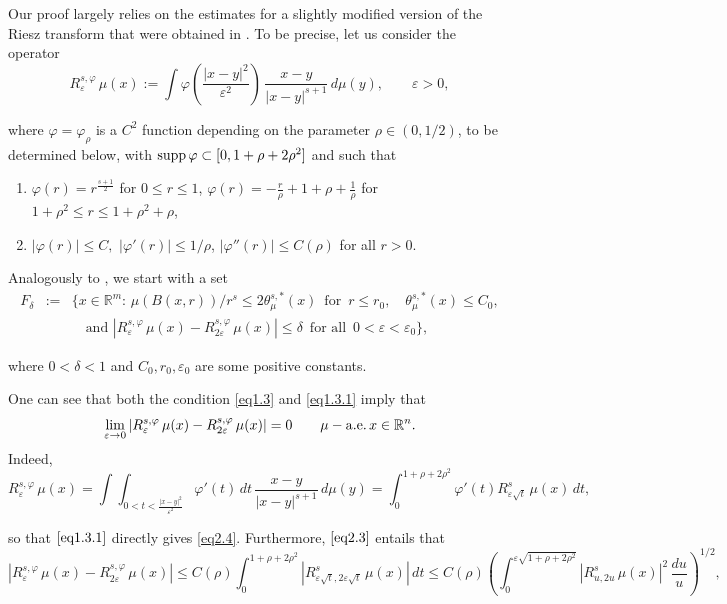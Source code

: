 \documentclass{elsart3-1}
\newcommand{\RR}{{\mathbb{R}}}
\newcommand{\eps}{\varepsilon}
\begin{document}
Our proof largely relies on the estimates for a slightly modified version of the Riesz transform that were obtained in \cite{RdVTolsa}. To be precise, let us consider the operator
\begin{equation}\label{eq2.1}
R^{s,\varphi}_{\eps}\, \mu(x):=\int\varphi\left(\frac{|x-y|^2}{\eps^2}\right)\,\frac{x-y}{|x-y|^{s+1}}\,d\mu(y), \qquad \eps>0,
\end{equation}

\noindent where $\varphi=\varphi_\rho$ is a $C^2$ function depending on the parameter $\rho\in(0,1/2)$, to be determined below, with ${\rm supp}\,\varphi\subset [0,1+\rho+2\rho^2]$ and such that
\begin{enumerate}
\item $\varphi(r)=r^{\frac{s+1}{2}}$ for $0\leq r \leq 1$,
\qquad $\varphi(r)=-\frac r\rho+1+\rho+\frac 1\rho$ for $1+\rho^2\leq r\leq 1+\rho^2+\rho$,
\item $|\varphi(r)|\leq C,$ $|\varphi'(r)|\leq 1/\rho$, $|\varphi''(r)|\leq C(\rho)$ for all $r>0$.
\end{enumerate} 

Analogously to \cite{RdVTolsa}, we start with a set 
\begin{eqnarray}\label{eq2.2}
\nonumber F_\delta &:=& \{x\in \RR^m:\,\mu (B(x,r))/r^s\leq 2\theta_\mu^{s,\ast}(x)\,\mbox{ for }\,r\leq r_0,\quad \theta_\mu^{s,\ast}(x)\leq C_0,\\[4pt]
&&\quad \mbox{and } |R^{s,\varphi}_{\eps}\,\mu(x)-R^{s, \varphi}_{2\eps}\,\mu(x)|\leq \delta \,\mbox{ for all }\,0<\eps<\eps_0\},
\end{eqnarray}

\noindent where $0<\delta<1$ and $C_0, r_0,\eps_0$ are some positive constants.  

One can see that both the condition \eqref{eq1.3} and \eqref{eq1.3.1} imply that 
\begin{equation}\label{eq2.4}
\lim_{\eps\to 0}|R^{s,\varphi}_{\eps}\,\mu(x)-R^{s,\varphi}_{2\eps}\,\mu(x)|=0 \qquad \mu - {\rm a.e.}\,x\in\RR^n.
\end{equation}
\noindent Indeed, 
\begin{equation}\label{eq2.3}
R^{s,\varphi}_{\eps}\, \mu(x)=\int\int_{0<t<\frac{|x-y|^2}{\eps^2}}\varphi'(t)\,dt\,\frac{x-y}{|x-y|^{s+1}}\,d\mu(y)=\int_0^{1+\rho+2\rho^2} \varphi'(t)R_{\eps\sqrt t}^{s}\,\mu(x)\,dt, 
\end{equation}

\noindent so that  $\eqref{eq1.3.1}$ directly gives \eqref{eq2.4}. Furthermore,  $\eqref{eq2.3}$ entails that
\begin{equation}\label{eq2.3.1}\nonumber
\left|R^{s,\varphi}_{\eps}\, \mu(x)-R^{s,\varphi}_{2\eps}\, \mu(x)\right|\leq C(\rho) \int_0^{1+\rho+2\rho^2} |R_{\eps\sqrt t,2\eps\sqrt t}^{s}\,\mu(x)|\,dt\leq C(\rho)\left(\int_0^{\eps\sqrt{1+\rho+2\rho^2}}|R_{u,2u}^{s}\,\mu(x)|^2\,\frac{du}{u}\right)^{1/2},
\end{equation}
\end{document}

